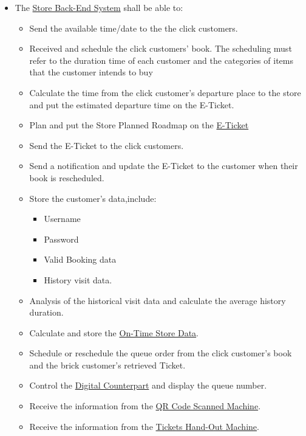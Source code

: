 \documentclass[a4paper,12pt]{report}
\begin{document}
\begin{itemize}
	\item The \hyperref[Definitions]{Store Back-End System} shall be able to:
	\begin{itemize}
		\item Send the available time/date to the the click customers.
		\item Received and schedule the click customers' book. The scheduling must refer to the duration time of each customer and the categories of items that the customer intends to buy
		\item Calculate the time from the click customer's departure place to the store and put the estimated departure time on the E-Ticket.
		\item Plan and put the Store Planned Roadmap on the \hyperref[Definitions]{E-Ticket}
		\item Send the  E-Ticket to the click customers.
		\item Send a notification and update the E-Ticket to the customer when their book is rescheduled.
		\item Store the customer's data,include:
		\begin{itemize}
			\item Username
			\item Password
			\item Valid Booking data
			\item History visit data.
		\end{itemize}
		\item Analysis of the historical visit data and calculate the average history duration.
		\item Calculate and store the \hyperref[Definitions]{On-Time Store Data}.
		\item Schedule or reschedule the queue order from the click customer's book and the brick customer's retrieved Ticket.
		\item Control the \hyperref[Definitions]{Digital Counterpart} and display the queue number.
		\item Receive the information from the \hyperref[Definitions]{QR Code Scanned Machine}.
		\item Receive the information from the \hyperref[Definitions]{Tickets Hand-Out Machine}.
	\end{itemize}
\end{itemize}
\end{document}
